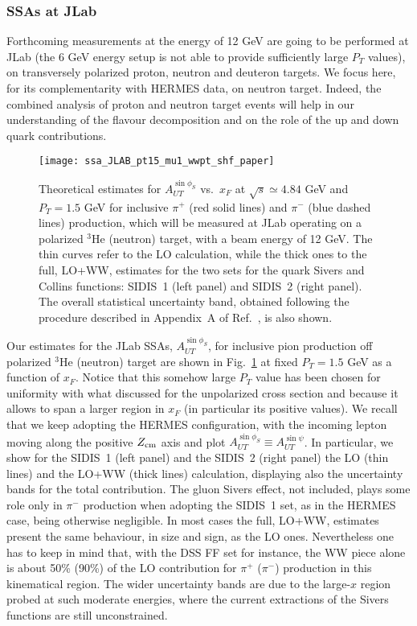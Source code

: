 \documentclass[nofootinbib,superscriptaddress,aps]{revtex4}
\begin{document}
\subsubsection{SSAs at JLab}


Forthcoming measurements at the energy of 12 GeV are going to be performed at JLab (the 6 GeV energy setup is not able to provide sufficiently large $P_T$ values), on transversely polarized proton, neutron and deuteron targets. We focus here, for its complementarity with HERMES data, on neutron target. Indeed, the combined analysis of proton and neutron
target events will help in our understanding of the flavour decomposition and on the role of the up and down quark contributions.


\begin{figure}[ht!]
 \centering
 \texttt{[image: ssa\_JLAB\_pt15\_mu1\_wwpt\_shf\_paper]}
 \caption{Theoretical estimates for $A_{UT}^{\sin\phi_S}$ vs.~$x_F$ at $\sqrt{s}\simeq 4.84$ GeV and $P_T = 1.5$ GeV for inclusive $\pi^+$ (red solid lines) and $\pi^-$ (blue dashed lines) production, which will be measured at JLab operating on a polarized $^3$He (neutron) target, with a beam energy of 12 GeV. The thin curves refer to the LO calculation, while the thick ones to the full, LO+WW, estimates for the two sets for the quark Sivers and Collins functions: SIDIS~1 (left panel) and SIDIS~2 (right panel). The overall statistical uncertainty band, obtained following the procedure described in Appendix~A of Ref.~\cite{Anselmino:2008sga}, is also shown.
}
  \label{fig:SSA-jlab-pi-pt15}
\end{figure}

Our estimates for the JLab SSAs, $A_{UT}^{\sin\phi_S}$, for inclusive pion production off polarized $^3$He (neutron) target are shown in Fig.~\ref{fig:SSA-jlab-pi-pt15} at fixed $P_T=1.5$ GeV as a function of $x_F$. Notice that this somehow large $P_T$ value has been chosen for uniformity with what discussed for the unpolarized cross section and because it allows to span a larger region in $x_F$ (in particular its positive values). We recall that we keep adopting the HERMES configuration, with the incoming lepton moving along the positive $Z_{\rm cm}$ axis and plot $A_{UT}^{\sin\phi_S}\equiv A_{UT}^{\sin\psi}$. In particular, we show for the SIDIS~1 (left panel) and the SIDIS~2 (right panel) the LO (thin lines) and the LO+WW (thick lines) calculation, displaying also the uncertainty bands for the total contribution. The gluon Sivers effect, not included, plays some role only in $\pi^-$ production when adopting the SIDIS~1 set, as in the HERMES case, being otherwise negligible. In most cases the full, LO+WW, estimates present the same behaviour, in size and sign, as the LO ones. Nevertheless one has to keep in mind that, with the DSS FF set for instance, the WW piece alone is about 50\% (90\%) of the LO contribution for $\pi^+$ ($\pi^-$) production in this kinematical region.
The wider uncertainty bands are due to the large-$x$ region probed at such moderate energies, where the current extractions of the Sivers functions are still unconstrained.
\end{document}
